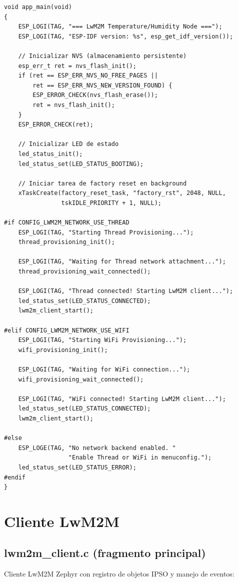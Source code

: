 \begin{verbatim}
void app_main(void)
{
    ESP_LOGI(TAG, "=== LwM2M Temperature/Humidity Node ===");
    ESP_LOGI(TAG, "ESP-IDF version: %s", esp_get_idf_version());
    
    // Inicializar NVS (almacenamiento persistente)
    esp_err_t ret = nvs_flash_init();
    if (ret == ESP_ERR_NVS_NO_FREE_PAGES || 
        ret == ESP_ERR_NVS_NEW_VERSION_FOUND) {
        ESP_ERROR_CHECK(nvs_flash_erase());
        ret = nvs_flash_init();
    }
    ESP_ERROR_CHECK(ret);
    
    // Inicializar LED de estado
    led_status_init();
    led_status_set(LED_STATUS_BOOTING);
    
    // Iniciar tarea de factory reset en background
    xTaskCreate(factory_reset_task, "factory_rst", 2048, NULL, 
                tskIDLE_PRIORITY + 1, NULL);
    
#if CONFIG_LWM2M_NETWORK_USE_THREAD
    ESP_LOGI(TAG, "Starting Thread Provisioning...");
    thread_provisioning_init();
    
    ESP_LOGI(TAG, "Waiting for Thread network attachment...");
    thread_provisioning_wait_connected();
    
    ESP_LOGI(TAG, "Thread connected! Starting LwM2M client...");
    led_status_set(LED_STATUS_CONNECTED);
    lwm2m_client_start();
    
#elif CONFIG_LWM2M_NETWORK_USE_WIFI
    ESP_LOGI(TAG, "Starting WiFi Provisioning...");
    wifi_provisioning_init();
    
    ESP_LOGI(TAG, "Waiting for WiFi connection...");
    wifi_provisioning_wait_connected();
    
    ESP_LOGI(TAG, "WiFi connected! Starting LwM2M client...");
    led_status_set(LED_STATUS_CONNECTED);
    lwm2m_client_start();
    
#else
    ESP_LOGE(TAG, "No network backend enabled. "
                  "Enable Thread or WiFi in menuconfig.");
    led_status_set(LED_STATUS_ERROR);
#endif
}
\end{verbatim}

\section{Cliente LwM2M}

\subsection{lwm2m\_client.c (fragmento principal)}

Cliente LwM2M Zephyr con registro de objetos IPSO y manejo de eventos:

